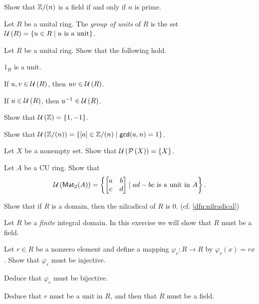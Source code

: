 \begin{exercise}
Show that \(\mathbb{Z}/(n)\) is a field if and only if \(n\) is prime.
\end{exercise}

\begin{dfn}
Let \(R\) be a unital ring.
The \emph{group of units} of \(R\) is the set \(\UNITS{R} = \{ u \in R \mid u\ \mathrm{is\ a\ unit} \}\).
\end{dfn}

\begin{exercise} \label{exerc:units-form-group}
Let \(R\) be a unital ring.
Show that the following hold.
\begin{proplist*}
\item \(1_R\) is a unit.
\item If \(u, v \in  \mathcal{U}\left(R\right) \), then \(uv \in  \mathcal{U}\left(R\right) \).
\item If \(u \in  \mathcal{U}\left(R\right) \), then \(u^{-1} \in  \mathcal{U}\left(R\right) \).
\end{proplist*}
\end{exercise}

\begin{exercise}
Show that \( \mathcal{U}\left(\mathbb{Z}\right)  = \{ 1, -1 \}\).
\end{exercise}

\begin{exercise}
Show that \( \mathcal{U}\left(\mathbb{Z}/(n)\right)  = \{ [a] \in \mathbb{Z}/(n) \mid \mathsf{gcd}(a, n) = 1 \}\).
\end{exercise}

\begin{exercise}
Let \(X\) be a nonempty set.
Show that \( \mathcal{U}\left(\mathcal{P}\left(X\right)\right)  = \{X\}\).
\end{exercise}

\begin{exercise}
Let \(A\) be a CU ring.
Show that \[  \mathcal{U}\left(\mathsf{Mat}_{2}(A)\right)  = \left\{ \begin{bmatrix} a & b \\ c & d \end{bmatrix} \mid ad - bc\ \mathrm{is\ a\ unit\ in}\ A \right\}. \]
\end{exercise}

\begin{exercise}
Show that if \(R\) is a domain, then the nilradical of \(R\) is \(0\).
(cf. \autoref{dfn:nilradical})
\end{exercise}

\begin{exercise}
Let \(R\) be a \emph{finite} integral domain.
In this exercise we will show that \(R\) must be a field.
\begin{proplist}
\item Let \(r \in R\) be a nonzero element and define a mapping \(\varphi_r : R \rightarrow R\) by \(\varphi_r(x) = rx\).
Show that \(\varphi_r\) must be injective.
\item Deduce that \(\varphi_r\) must be bijective.
\item Deduce that \(r\) must be a unit in \(R\), and then that \(R\) must be a field.
\end{proplist}
\end{exercise}

